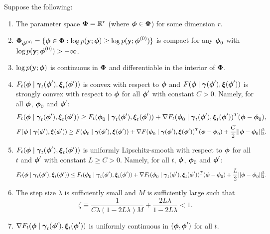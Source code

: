 \begin{theorem}

    Suppose the following:
    
    \begin{enumerate}
        \item The parameter space $\bfPhi = \bbR^r$ (where $\bfphi \in \bfPhi$) for some dimension $r$.
        \item $\bfPhi_{\bfphi^{(0)}} = \{\bfphi \in \bfPhi: \log p(\bfy;\bfphi) \geq \log p(\bfy;\bfphi^{(0)})\}$ is compact for any  $\bfphi_0$ with $\log p(\bfy;\bfphi^{(0)}) > -\infty$.
        \item $\log p(\bfy;\bfphi)$ is continuous in $\bfPhi$ and differentiable in the interior of $\bfPhi$.
        \item $F_t(\bfphi \mid \bfgamma_t(\bfphi'), \bfxi_t(\bfphi'))$ is convex with respect to $\bfphi$ and $F(\bfphi \mid \bfgamma(\bfphi'), \bfxi(\bfphi'))$ is strongly convex with respect to $\bfphi$ for all $\bfphi'$ with constant $C > 0$. Namely, for all $\bfphi$, $\bfphi_0$ and $\bfphi'$:
        \begin{equation}
            F_t(\bfphi \mid \bfgamma_t(\bfphi'), \bfxi_t(\bfphi')) \geq F_t(\bfphi_0 \mid \bfgamma_t(\bfphi'), \bfxi_t(\bfphi')) + \nabla F_t(\bfphi_0 \mid \bfgamma_t(\bfphi'), \bfxi_t(\bfphi'))^T(\bfphi-\bfphi_0),
        \end{equation}
        \begin{equation}
            F(\bfphi \mid \bfgamma(\bfphi'), \bfxi(\bfphi')) \geq F(\bfphi_0 \mid \bfgamma(\bfphi'), \bfxi(\bfphi')) + \nabla F(\bfphi_0 \mid \bfgamma(\bfphi'), \bfxi(\bfphi'))^T(\bfphi-\bfphi_0) + \frac{C}{2} ||\bfphi - \bfphi_0||_2^2.
        \end{equation}
        \item $F_t(\bfphi \mid \bfgamma_t(\bfphi'), \bfxi_t(\bfphi'))$ is uniformly Lipschitz-smooth with respect to $\bfphi$ for all $t$ and $\bfphi'$ with constant $L \geq C > 0$. Namely, for all $t$, $\bfphi$, $\bfphi_0$ and $\bfphi'$:
        \begin{equation}
            F_t(\bfphi \mid \bfgamma_t(\bfphi'), \bfxi_t(\bfphi')) \leq F_t(\bfphi_0 \mid \bfgamma_t(\bfphi'), \bfxi_t(\bfphi')) + \nabla F_t(\bfphi_0 \mid \bfgamma_t(\bfphi'), \bfxi_t(\bfphi'))^T(\bfphi - \bfphi_0) + \frac{L}{2} || \bfphi - \bfphi_0 ||_2^2.
        \end{equation}
        \item The step size $\lambda$ is sufficiently small and $M$ is sufficiently large such that
        \begin{equation}
            \zeta \equiv \frac{1}{C \lambda(1-2L\lambda)M} + \frac{2L\lambda}{1-2L\lambda} < 1.
        \end{equation}
        \item $\nabla F_t(\bfphi \mid \bfgamma_t(\bfphi'), \bfxi_t(\bfphi'))$ is uniformly continuous in $(\bfphi,\bfphi')$ for all $t$.
    \end{enumerate}
    

\end{theorem}
